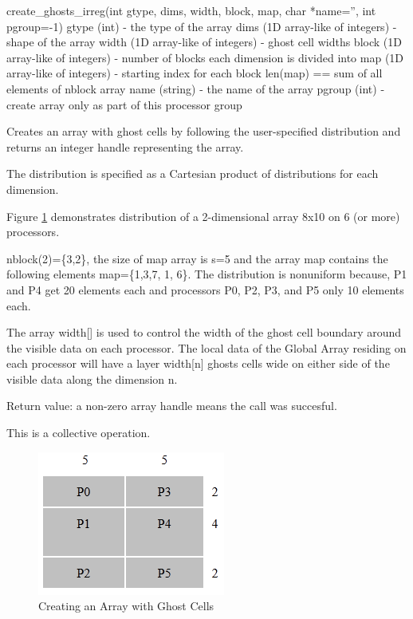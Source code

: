\documentclass[12pt]{article}
\begin{document}
\begin{pyapi}
\begin{pycode}
create_ghosts_irreg(int gtype, dims, width, block, map, char *name='',
int pgroup=-1)
   gtype (int)                       - the type of the array
   dims (1D array-like of integers)  - shape of the array
   width (1D array-like of integers) - ghost cell widths
   block (1D array-like of integers) - number of blocks each dimension is
                                       divided into
   map (1D array-like of integers)   - starting index for each block
                                       len(map) == sum of all elements of
                                       nblock array
   name (string)                     - the name of the array
   pgroup (int)                      - create array only as part of this
                                       processor group
\end{pycode}
\end{pyapi}
\dcoll

\begin{desc}

  Creates an array with ghost cells by following the user-specified
  distribution and returns an integer handle representing the array.

  The distribution is specified as a Cartesian product of
  distributions for each dimension.

Figure \ref{crghostir} demonstrates distribution of a 2-dimensional
array 8x10 on 6 (or more) processors.

nblock(2)=\{3,2\}, the size of map array is s=5 and the array map contains
the following elements map=\{1,3,7, 1, 6\}. The distribution is nonuniform
because, P1 and P4 get 20 elements each and processors P0, P2, P3, and P5
only 10 elements each.

The array width[] is used to control the width of the ghost cell boundary
around the visible data on each processor. The local data of the Global Array
residing on each processor will have a layer width[n] ghosts cells wide on
either side of the visible data along the dimension n.

Return value: a non-zero array handle means the call was succesful.

This is a collective operation.

\begin{figure}
\includegraphics{CrGhostIr}
\centering
\caption{Creating an Array with Ghost Cells}
\label{crghostir}
\end{figure}

\end{desc}
\end{document}
